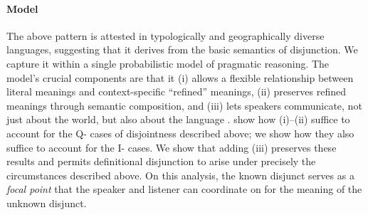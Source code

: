 \documentclass[12pt]{article}
\newcommand{\tech}[1]{\emph{#1}}
\begin{document}
\paragraph{Model} The above pattern is attested in typologically and
geographically diverse languages, suggesting that it derives from the
basic semantics of disjunction. We capture it within a single
probabilistic model of pragmatic reasoning. The model's crucial
components are that it (i) allows a flexible relationship between
literal meanings and context-specific ``refined'' meanings, (ii)
preserves refined meanings through semantic composition, and (iii)
lets speakers communicate, not just about the world, but also about
the language \citep{Smith:Goodman:Frank:2013}.
\citet{bergen-levy-goodman:2014} show how (i)--(ii) suffice to account
for the Q- cases of disjointness described above; we show how they
also suffice to account for the I- cases.  We show that adding (iii)
preserves these results and permits definitional disjunction to arise
under precisely the circumstances described above. On this analysis,
the known disjunct serves as a \tech{focal point} that the speaker and
listener can coordinate on for the meaning of the unknown disjunct.


\let\olditem\item
\renewenvironment{thebibliography}[1]{
\footnotesize
  \paragraph{References}
  \let\par\relax\let\newblock\relax
  \renewcommand{\item}[1][]{\olditem[\textbullet]}%
  \inparaenum
}{\endinparaenum}

\vfill


\begin{spacing}{0.75}

\end{spacing}
\end{document}
